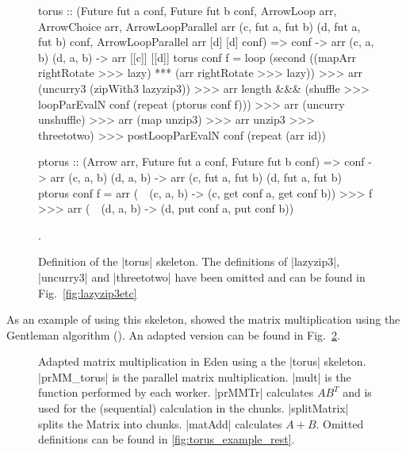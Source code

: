 \begin{figure}[tb]
\begin{code}
torus :: (Future fut a conf, Future fut b conf,
      ArrowLoop arr, ArrowChoice arr,
      ArrowLoopParallel arr (c, fut a, fut b) (d, fut a, fut b) conf,
      ArrowLoopParallel arr [d] [d] conf) =>
      conf -> arr (c, a, b) (d, a, b) -> arr [[c]] [[d]]
torus conf f =
    loop (second ((mapArr rightRotate >>> lazy) *** (arr rightRotate >>> lazy)) >>>
        arr (uncurry3 (zipWith3 lazyzip3)) >>>
        arr length &&& (shuffle >>> loopParEvalN conf (repeat (ptorus conf f))) >>>
        arr (uncurry unshuffle) >>>
        arr (map unzip3) >>> arr unzip3 >>> threetotwo) >>>
    postLoopParEvalN conf (repeat (arr id))

ptorus :: (Arrow arr, Future fut a conf, Future fut b conf) =>
          conf ->
          arr (c, a, b) (d, a, b) ->
          arr (c, fut a, fut b) (d, fut a, fut b)
ptorus conf f =
	arr (\ ~(c, a, b) -> (c, get conf a, get conf b)) >>>
	f >>>
	arr (\ ~(d, a, b) -> (d, put conf a, put conf b))
\end{code} %
\caption{Definition of the |torus| skeleton. The definitions of |lazyzip3|, |uncurry3| and |threetotwo| have been omitted and can be found in Fig.~\ref{fig:lazyzip3etc}}.
\label{fig:torus}
\end{figure}
As an example of using this skeleton, \citet{Eden:SkeletonBookChapter02} showed the matrix multiplication using the Gentleman algorithm (\citeyear{Gentleman1978}). An adapted version can be found in Fig.~\ref{fig:torusMatMult}.
\begin{figure}[tb]
\caption{Adapted matrix multiplication in Eden using a the |torus| skeleton. |prMM_torus| is the parallel matrix multiplication. |mult| is the function performed by each worker. |prMMTr| calculates $AB^T$ and is used for the (sequential) calculation in the chunks. |splitMatrix| splits the Matrix into chunks. |matAdd| calculates $A + B$. Omitted definitions can be found in \ref{fig:torus_example_rest}. }
\label{fig:torusMatMult}
\end{figure}
